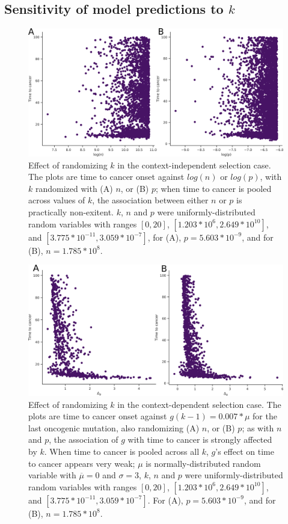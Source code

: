 \documentclass[9pt,onecolumn,twoside]{pnas-new}
\begin{document}
	\subsection{Sensitivity of model predictions to $k$}\label{S2 Text}
		\renewcommand{\thefigure}{S2.\arabic{figure}}
		\setcounter{figure}{0}
		\begin{figure}[tbhp]
			\centering
			\includegraphics[width=.8\linewidth]{figS2-1.png}
			\caption{Effect of randomizing $k$ in the context-independent selection case. The plots are time to cancer onset against $log(n)$ or $log(p)$, with $k$ randomized with (A) $n$, or (B) $p$; when time to cancer is pooled across values of $k$, the association between either $n$ or $p$ is practically non-exitent. $k$, $n$ and $p$ were uniformly-distributed random variables with ranges $[0, 20]$, $[1.203*10^{6}, 2.649*10^{10}]$, and $[3.775*10^{-11}, 3.059*10^{-7}]$, for (A), $p=5.603*10^{-9}$, and for (B), $n=1.785*10^{8}$.}
			\label{figS2.1}
		\end{figure}

		\begin{figure}[tbhp]
			\centering
			\includegraphics[width=.8\linewidth]{figS2-2.png}
			\caption{Effect of randomizing $k$ in the context-dependent selection case. The plots are time to cancer onset against $g(k-1) = 0.007*\mu$ for the last oncogenic mutation, also randomizing (A) $n$, or (B) $p$; as with $n$ and $p$, the association of $g$ with time to cancer is strongly affected by $k$. When time to cancer is pooled across all $k$, $g$'s effect on time to cancer appears very weak; $\mu$ is normally-distributed random variable with $\overline{\mu}=0$ and $\sigma=3$, $k$, $n$ and $p$ were uniformly-distributed random variables with ranges $[0, 20]$, $[1.203*10^{6}, 2.649*10^{10}]$, and $[3.775*10^{-11}, 3.059*10^{-7}]$. For (A), $p=5.603*10^{-9}$, and for (B), $n=1.785*10^{8}$.}
			\label{figS2.2}
		\end{figure}
\end{document}
